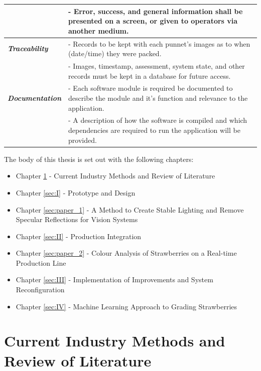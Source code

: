 \documentclass[fleqn,twoside,12pt]{report}
\begin{document}
\begin{longtable}{p{2.5cm}p{12cm}}
	& - Error, success, and general information shall be presented on a screen, or given to operators via another medium.  \\[2pt]
	\hline
	\textbf{\textit{Traceability}}		& - Records to be kept with each punnet's images as to when (date/time) they were packed.  \\[4pt]
	& - Images, timestamp, assessment, system state, and other records must be kept in a database for future access. \\[2pt]
	\hline
	\textbf{\textit{Documentation}}	& - Each software module is required be documented to describe the module and it's function and relevance to the application.  \\[4pt]
	& - A description of how the software is compiled and which dependencies are required to run the application will be provided. \\[2pt]
	\hline
\end{longtable}


\newpage


The body of this thesis is set out with the following chapters: 


\begin{itemize}
	\item Chapter \ref{sec:lit} - Current Industry Methods and Review of Literature
	\item Chapter \ref{sec:I} - Prototype and Design
	\item Chapter \ref{sec:paper_1} - A Method to Create Stable Lighting and Remove Specular Reflections for Vision Systems
	\item Chapter \ref{sec:II} - Production Integration 
	\item Chapter \ref{sec:paper_2} - Colour Analysis of Strawberries on a Real-time Production Line
	\item Chapter \ref{sec:III} - Implementation of Improvements and System Reconfiguration
	\item Chapter \ref{sec:IV} - Machine Learning Approach to Grading Strawberries
\end{itemize}






\newpage

\chapter{Current Industry Methods and Review of Literature}
\label{sec:lit}
\end{document}
